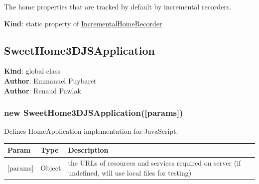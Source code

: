 \documentclass[a4paper]{report}
\begin{document}
The home properties that are tracked by default by incremental
recorders.

\textbf{Kind}: static property of
\protect\hyperlink{IncrementalHomeRecorder}{IncrementalHomeRecorder}\\

\hypertarget{sweethome3djsapplication}{%
\subsection{SweetHome3DJSApplication}\label{sweethome3djsapplication}}

\textbf{Kind}: global class\\
\textbf{Author}: Emmanuel Puybaret\\
\textbf{Author}: Renaud Pawlak\\

\hypertarget{new-sweethome3djsapplicationparams}{%
\subsubsection{new
SweetHome3DJSApplication({[}params{]})}\label{new-sweethome3djsapplicationparams}}

Defines HomeApplication implementation for JavaScript.

\begin{longtable}[]{@{}lll@{}}
\toprule
\begin{minipage}[b]{0.30\columnwidth}\raggedright
Param\strut
\end{minipage} & \begin{minipage}[b]{0.30\columnwidth}\raggedright
Type\strut
\end{minipage} & \begin{minipage}[b]{0.30\columnwidth}\raggedright
Description\strut
\end{minipage}\tabularnewline
\midrule
\endhead
\begin{minipage}[t]{0.30\columnwidth}\raggedright
{[}params{]}\strut
\end{minipage} & \begin{minipage}[t]{0.30\columnwidth}\raggedright
Object\strut
\end{minipage} & \begin{minipage}[t]{0.30\columnwidth}\raggedright
the URLs of resources and services required on server (if undefined,
will use local files for testing)\strut
\end{minipage}\tabularnewline
\bottomrule
\end{longtable}
\end{document}
